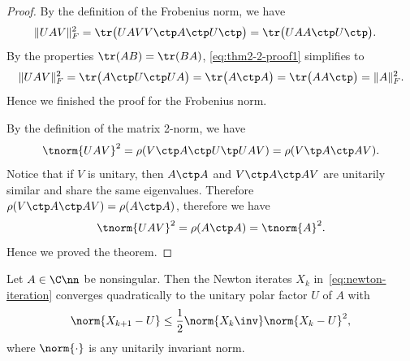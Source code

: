 \documentclass{article}
\numberwithin{equation}{section} %
\newcommand{\gnorm}[1]{\norm{#1}}
\begin{document}
\begin{proof}
By the definition of the Frobenius norm, we have
\begin{equation}
  \label{eq:thm2-2-proof1}
  \begin{aligned}
    \|UAV\|_F^2 &= \tr\big(U AVV\ctp A\ctp U\ctp \big) = \tr\big( U AA\ctp U\ctp\big).
  \end{aligned}
\end{equation}
By the properties $\tr(AB) = \tr(BA)$, \eqref{eq:thm2-2-proof1} simplifies
to
\begin{equation}
  \label{eq:thm2-2-proof2}
  \|U AV\|_F^2 = \tr\big(A\ctp U\ctp U A\big) = \tr\big(A\ctp A\big) = \tr\big(AA\ctp\big) = \|A\|_F^2.
\end{equation}
Hence we finished the proof for the Frobenius norm.

By the definition of the matrix 2-norm, we have
\begin{equation}\notag
  \tnorm{UAV}^2 = \rho(V\ctp A\ctp U\tp UAV) = \rho({V\tp A\ctp AV}).
\end{equation}
Notice that if $V$ is unitary, then $A\ctp A$ and $V\ctp A\ctp A V$ are
unitarily similar and share the same eigenvalues. Therefore
$\rho(V\ctp A\ctp AV) = \rho (A\ctp A)$, therefore we have
\begin{equation}\notag
  \tnorm{UAV}^2 = \rho(A\ctp A) = \tnorm{A}^2.
\end{equation}
Hence we proved the theorem.
\end{proof}

\begin{theorem}  \label{thm:newton-converge}
Let $A\in\C\nn$ be nonsingular. Then the Newton iterates $X_k$
in~\eqref{eq:newton-iteration} converges quadratically to the unitary polar
factor $U$ of $A$ with
\begin{equation}\notag
  \gnorm{X_{k+1} - U} \leq \frac 12 \gnorm{X_k\inv}\gnorm{X_k - U}^2,
\end{equation}
where $\gnorm{\cdot}$ is any unitarily invariant norm.
\end{theorem}
\end{document}
